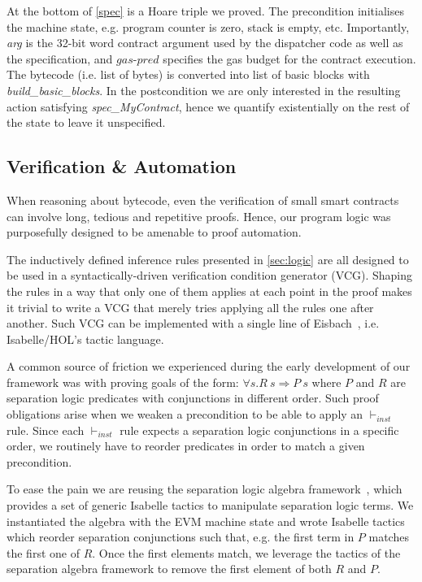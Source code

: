 \documentclass[sigplan,10pt,review]{acmart}\settopmatter{printfolios=true,printccs=false,printacmref=false}
\newcommand{\gaspred}{\mathit{gas\mbox{-}pred}}
\newcommand{\bblocks}{\mathit{build\mbox{-}blocks}}
\begin{document}
At the bottom of \autoref{spec} is a Hoare triple we proved.
The precondition initialises the machine state, e.g. program counter is zero,
stack is empty, etc. Importantly, \textit{arg} is the 32-bit word contract
argument used by the dispatcher code as well as the specification,
and $\gaspred$ specifies the gas budget for the contract execution.
The bytecode (i.e. list of bytes) is converted into list of basic blocks
with 
\textit{build\_basic\_blocks}.
In the postcondition we are only interested in the resulting action
satisfying \textit{spec\_MyContract}, hence we quantify existentially
on the rest of the state to leave it unspecified.

\subsection{Verification \& Automation}

When reasoning about bytecode, even the verification of small smart contracts
can involve long, tedious and repetitive proofs.
Hence, our program logic was purposefully designed to be
amenable to proof automation.

The inductively defined inference rules presented in \autoref{sec:logic}
are all designed to be used in a syntactically-driven verification
condition generator (VCG).
Shaping the rules in a way that only one of them applies at each point in the
proof makes it trivial to write a VCG that merely tries applying all the rules
one after another.
Such VCG can be implemented with a single line of Eisbach~\cite{Matichuk_MW_16},
i.e. Isabelle/HOL's tactic language.

A common source of friction we experienced during the early development
of our framework was with proving goals of the form:
$\forall s. R~s \Longrightarrow P~s$ where $P$ and $R$ are separation logic predicates
with conjunctions in different order.
Such proof obligations arise when we weaken a precondition to be
able to apply an $\vdash_\textit{inst}$ rule.
Since each $\vdash_\textit{inst}$ rule expects a separation logic conjunctions
in a specific order, we routinely have to reorder predicates in order to
match a given precondition.

To ease the pain we are reusing the separation logic algebra framework~\cite{Klein_KB_12},
which provides a set of generic Isabelle tactics to manipulate separation logic terms.
We instantiated the algebra with the EVM machine state and wrote Isabelle tactics
which reorder separation conjunctions such that, e.g. the first term in $P$ matches the first one of $R$.
Once the first elements match, we leverage the tactics of the separation
algebra framework to remove the first element of both $R$ and $P$.
\end{document}
